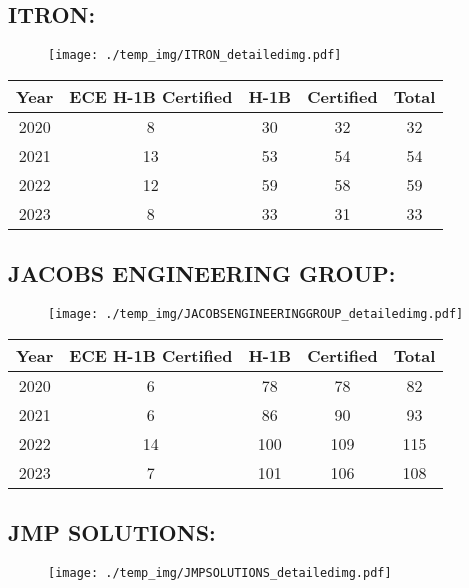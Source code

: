\documentclass{article}%
\begin{document}
%
\newpage%
\subsection{ITRON:}%
\label{subsec:ITRON}%
\label{ITRONdetailed}%


\begin{figure}[htbp]%
\centering%
\texttt{[image: ./temp\_img/ITRON\_detailedimg.pdf]}%
\end{figure}

%
\begin{longtable}{c|c|c|c|c}%
\hline%
Year&ECE H{-}1B Certified&H{-}1B&Certified&Total\\%
\hline%
2020&8&30&32&32\\%
\hline%
2021&13&53&54&54\\%
\hline%
2022&12&59&58&59\\%
\hline%
2023&8&33&31&33\\%
\hline%
\end{longtable}

%
\newpage%
\subsection{JACOBS ENGINEERING GROUP:}%
\label{subsec:JACOBSENGINEERINGGROUP}%
\label{JACOBSENGINEERINGGROUPdetailed}%


\begin{figure}[htbp]%
\centering%
\texttt{[image: ./temp\_img/JACOBSENGINEERINGGROUP\_detailedimg.pdf]}%
\end{figure}

%
\begin{longtable}{c|c|c|c|c}%
\hline%
Year&ECE H{-}1B Certified&H{-}1B&Certified&Total\\%
\hline%
2020&6&78&78&82\\%
\hline%
2021&6&86&90&93\\%
\hline%
2022&14&100&109&115\\%
\hline%
2023&7&101&106&108\\%
\hline%
\end{longtable}

%
\newpage%
\subsection{JMP SOLUTIONS:}%
\label{subsec:JMPSOLUTIONS}%
\label{JMPSOLUTIONSdetailed}%


\begin{figure}[htbp]%
\centering%
\texttt{[image: ./temp\_img/JMPSOLUTIONS\_detailedimg.pdf]}%
\end{figure}
\end{document}
